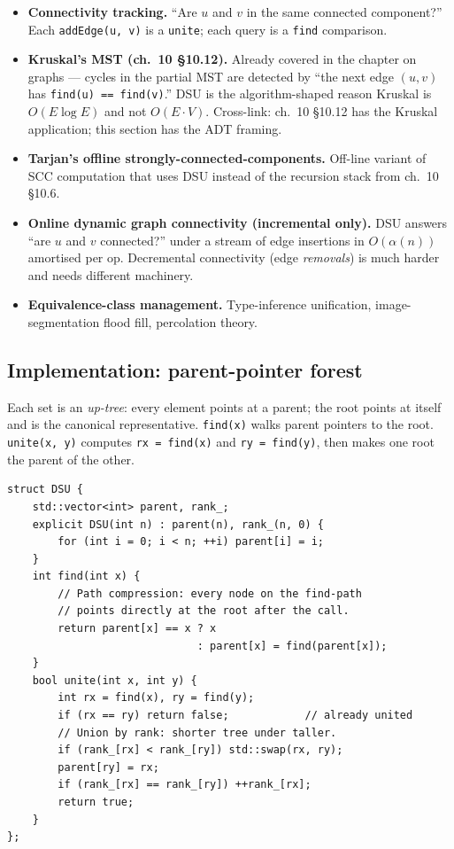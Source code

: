 \documentclass[11pt]{article}
\begin{document}
\begin{itemize}[leftmargin=*]
    \item \textbf{Connectivity tracking.} ``Are $u$ and $v$ in the
          same connected component?'' Each \texttt{addEdge(u, v)}
          is a \texttt{unite}; each query is a \texttt{find}
          comparison.
    \item \textbf{Kruskal's MST (ch.~10 \S10.12).} Already covered
          in the chapter on graphs --- cycles in the partial MST
          are detected by ``the next edge $(u, v)$ has
          \texttt{find(u) == find(v)}.'' DSU is the
          algorithm-shaped reason Kruskal is $O(E \log E)$ and not
          $O(E \cdot V)$. Cross-link: ch.~10 \S10.12 has the
          Kruskal application; this section has the ADT framing.
    \item \textbf{Tarjan's offline strongly-connected-components.}
          Off-line variant of SCC computation that uses DSU
          instead of the recursion stack from ch.~10 \S10.6.
    \item \textbf{Online dynamic graph connectivity (incremental
          only).} DSU answers ``are $u$ and $v$ connected?'' under
          a stream of edge insertions in $O(\alpha(n))$ amortised
          per op. Decremental connectivity (edge \emph{removals})
          is much harder and needs different machinery.
    \item \textbf{Equivalence-class management.} Type-inference
          unification, image-segmentation flood fill, percolation
          theory.
\end{itemize}

\subsection*{Implementation: parent-pointer forest}

Each set is an \emph{up-tree}: every element points at a parent;
the root points at itself and is the canonical representative.
\texttt{find(x)} walks parent pointers to the root.
\texttt{unite(x, y)} computes \texttt{rx = find(x)} and
\texttt{ry = find(y)}, then makes one root the parent of the other.

\begin{lstlisting}[basicstyle=\ttfamily\small,frame=single]
struct DSU {
    std::vector<int> parent, rank_;
    explicit DSU(int n) : parent(n), rank_(n, 0) {
        for (int i = 0; i < n; ++i) parent[i] = i;
    }
    int find(int x) {
        // Path compression: every node on the find-path
        // points directly at the root after the call.
        return parent[x] == x ? x
                              : parent[x] = find(parent[x]);
    }
    bool unite(int x, int y) {
        int rx = find(x), ry = find(y);
        if (rx == ry) return false;            // already united
        // Union by rank: shorter tree under taller.
        if (rank_[rx] < rank_[ry]) std::swap(rx, ry);
        parent[ry] = rx;
        if (rank_[rx] == rank_[ry]) ++rank_[rx];
        return true;
    }
};
\end{lstlisting}
\end{document}

